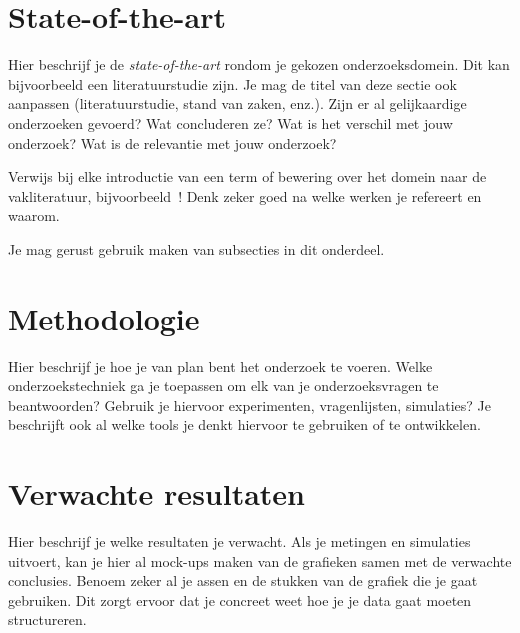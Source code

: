 \documentclass[fleqn,10pt]{voorstel}
\begin{document}

\section{State-of-the-art}
\label{sec:state-of-the-art}

Hier beschrijf je de \emph{state-of-the-art} rondom je gekozen onderzoeksdomein. Dit kan bijvoorbeeld een literatuurstudie zijn. Je mag de titel van deze sectie ook aanpassen (literatuurstudie, stand van zaken, enz.). Zijn er al gelijkaardige onderzoeken gevoerd? Wat concluderen ze? Wat is het verschil met jouw onderzoek? Wat is de relevantie met jouw onderzoek?

Verwijs bij elke introductie van een term of bewering over het domein naar de vakliteratuur, bijvoorbeeld~\autocite{Doll1954}! Denk zeker goed na welke werken je refereert en waarom.


Je mag gerust gebruik maken van subsecties in dit onderdeel.

\section{Methodologie}
\label{sec:methodologie}

Hier beschrijf je hoe je van plan bent het onderzoek te voeren. Welke onderzoekstechniek ga je toepassen om elk van je onderzoeksvragen te beantwoorden? Gebruik je hiervoor experimenten, vragenlijsten, simulaties? Je beschrijft ook al welke tools je denkt hiervoor te gebruiken of te ontwikkelen.

\section{Verwachte resultaten}
\label{sec:verwachte_resultaten}

Hier beschrijf je welke resultaten je verwacht. Als je metingen en simulaties uitvoert, kan je hier al mock-ups maken van de grafieken samen met de verwachte conclusies. Benoem zeker al je assen en de stukken van de grafiek die je gaat gebruiken. Dit zorgt ervoor dat je concreet weet hoe je je data gaat moeten structureren.
\end{document}
